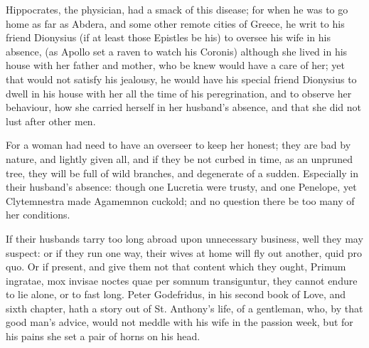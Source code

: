 {Hippocrates, the physician, had a smack of this disease; for when he
was to go home as far as Abdera, and some other remote cities of
Greece, he writ to his friend Dionysius (if at least those
Epistles be his)  to oversee his wife in his absence, (as
Apollo set a raven to watch his Coronis) although she lived in his
house with her father and mother, who be knew would have a care of her;
yet that would not satisfy his jealousy, he would have his special
friend Dionysius to dwell in his house with her all the time of his
peregrination, and to observe her behaviour, how she carried herself in
her husband's absence, and that she did not lust after other men.

For a woman had need to have an overseer to keep her honest; they
are bad by nature, and lightly given all, and if they be not curbed in
time, as an unpruned tree, they will be full of wild branches, and
degenerate of a sudden. Especially in their husband's absence: though
one Lucretia were trusty, and one Penelope, yet Clytemnestra made
Agamemnon cuckold; and no question there be too many of her conditions.

If their husbands tarry too long abroad upon unnecessary business, well
they may suspect: or if they run one way, their wives at home will fly
out another, quid pro quo. Or if present, and give them not that
content which they ought, Primum ingratae, mox invisae noctes
quae per somnum transiguntur, they cannot endure to lie alone, or to
fast long.  Peter Godefridus, in his second book of Love, and
sixth chapter, hath a story out of St. Anthony's life, of a gentleman,
who, by that good man's advice, would not meddle with his wife in the
passion week, but for his pains she set a pair of horns on his head.

}
